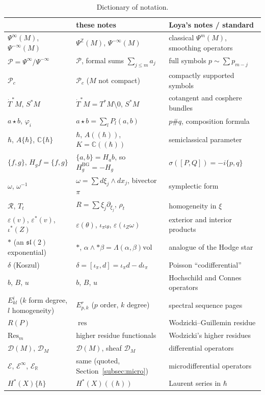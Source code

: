 \documentclass[11pt,oneside,reqno]{article}
\DeclareMathOperator{\res}{res}
\newcommand{\C}{\mathbb C}
\newcommand{\R}{\mathbb R}
\newcommand{\Z}{\mathbb Z}
\newcommand{\cD}{\mathcal D}
\newcommand{\cE}{\mathcal E}
\newcommand{\cP}{\mathcal P}
\newcommand{\Tdot}{\dot T^*}
\newcommand{\eps}{\varepsilon}
\newcommand{\vol}{\mathrm{vol}}
\newcommand{\hb}{\hbar}
\newcommand{\Lser}[1]{(\!(#1)\!)}
\newcommand{\pa}{\partial}
\theoremstyle{plain}
\theoremstyle{definition}
\theoremstyle{remark}
\begin{document}
\begin{table}[htbp]
\centering
\small
\renewcommand{\arraystretch}{1.15}
\begin{tabular}{>{\raggedright}p{3.6cm}>{\raggedright}p{5.2cm}>{\raggedright\arraybackslash}p{5.6cm}}
\hline
\cite{BG} & these notes & Loya's notes / standard\\
\hline
\(\Psi^\infty(M)\), \(\Psi^{-\infty}(M)\) & \(\Psi^{\Z}(M)\), \(\Psi^{-\infty}(M)\) & classical \(\Psi^m(M)\), smoothing operators\\
\(\cP=\Psi^\infty/\Psi^{-\infty}\) & \(\cP\), formal sums \(\sum_{j\le m}a_j\) & full symbols \(p\sim\sum p_{m-j}\)\\
\(\cP_c\) & \(\cP_c\) (\(M\) not compact) & compactly supported symbols\\
\(\Tdot M\), \(S^*M\) & \(\Tdot M=T^*M\setminus0\), \(S^*M\) & cotangent and cosphere bundles\\
\(a\star b\), \(\varphi_i\) & \(a\star b=\sum_lP_l(a,b)\) & \(p\#q\), composition formula\\
\(\hb\), \(A\{\hb\}\), \(\C\{\hb\}\) & \(\hb\), \(A\Lser{\hb}\), \(K=\C\Lser{\hb}\) & semiclassical parameter\\
\(\{f,g\}\), \(H_gf=\{f,g\}\) & \(\{a,b\}=H_ab\), so \(H^{\mathrm{BG}}_g=-H_g\) & \(\sigma([P,Q])=-i\{p,q\}\)\\
\(\omega\), \(\omega^{-1}\) & \(\omega=\sum d\xi_j\wedge dx_j\), bivector \(\pi\) & symplectic form\\
\(\mathcal R\), \(T_t\) & \(R=\sum\xi_j\pa_{\xi_j}\), \(\rho_t\) & homogeneity in \(\xi\)\\
\(\eps(v)\), \(\eps^*(v)\), \(\iota^*(Z)\) & \(\eps(\theta)\), \(\iota_{\pi^\sharp\theta}\), \(\eps(\iota_Z\omega)\) & exterior and interior products\\
\(*\) (an \(\mathfrak{sl}(2)\) exponential) & \(*\), \(\alpha\wedge*\beta=\Lambda(\alpha,\beta)\vol\) & analogue of the Hodge star\\
\(\delta\) (Koszul) & \(\delta=[\iota_\pi,d]=\iota_\pi d-d\iota_\pi\) & Poisson ``codifferential''\\
\(b\), \(B\), \(u\) & \(b\), \(B\), \(u\) & Hochschild and Connes operators\\
\(E^i_{kl}\) (\(k\) form degree, \(l\) homogeneity) & \(E^r_{p,k}\) (\(p\) order, \(k\) degree) & spectral sequence pages\\
\(R(P)\) & \(\res\) & Wodzicki--Guillemin residue\\
\(\mathrm{Res}_m\) & higher residue functionals & Wodzicki's higher residues\\
\(\cD(M)\), \(\cD_M\) & \(\cD(M)\), sheaf \(\cD_M\) & differential operators\\
\(\cE\), \(\cE^\infty\), \(\cE_{\R}\) & same (quoted, Section~\ref{subsec:micro}) & microdifferential operators\\
\(H^*(X)\{\hb\}\) & \(H^*(X)\Lser{\hb}\) & Laurent series in \(\hb\)\\
\hline
\end{tabular}
\caption{Dictionary of notation.}
\label{tab:dictionary}
\end{table}
\end{document}
